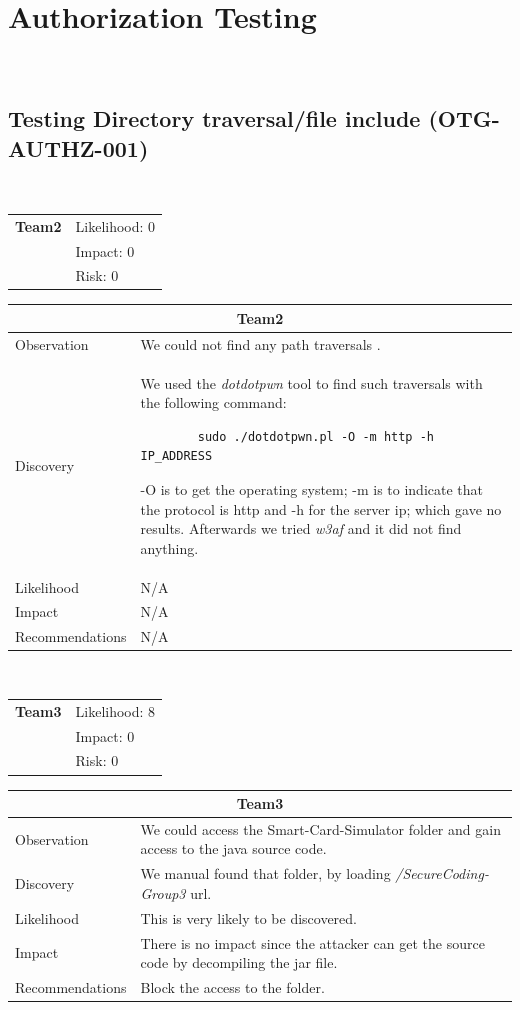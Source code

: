 \documentclass[headsepline,footsepline,footinclude=false,oneside,fontsize=11pt,paper=a4,listof=totoc,bibliography=totoc]{scrbook} %
\begin{document}
\pagebreak
\section{Authorization Testing}\
\subsection{Testing Directory traversal/file include (OTG-AUTHZ-001)}\

\begin{tabular}{cR{12cm}}
	\textbf{Team2} & Likelihood: 0\\& Impact: 0\\& Risk: 0 
\end{tabular}

\begin{tabular}{ l|p{11cm}  }
	\hline
	\multicolumn{2}{c}{\textbf{Team2}} \\
	\hline
	Observation   & We could not find any path traversals .\\
	Discovery  & We used the \textit{dotdotpwn} tool to find such traversals with the following command:
	\begin{lstlisting}
		sudo ./dotdotpwn.pl -O -m http -h IP_ADDRESS 
	\end{lstlisting}
	-O is to get the operating system;  
	-m is to indicate that the protocol is http and -h for the server ip;  
	which gave no results.
	Afterwards we tried \textit{w3af} and it did not find anything.\\
	Likelihood & N/A \\
	Impact    & N/A \\
	Recommendations & N/A \\ 
	\hline
\end{tabular}  \\

 \begin{tabular}{cR{12cm}}
 	\textbf{Team3} & Likelihood: 8\\& Impact: 0\\& Risk: 0 
 \end{tabular}
 
 \begin{tabular}{ l|p{11cm}  }
 	\hline
 	\multicolumn{2}{c}{\textbf{Team3}} \\
 	\hline
 	Observation   & We could access the Smart-Card-Simulator folder and gain access to the java source code.\\
 	Discovery  &  We manual found that folder, by loading \textit{/SecureCoding-Group3} url.\\
 	Likelihood & This is very likely to be discovered. \\
 	Impact    & There is no impact since the attacker can get the source code by decompiling the jar file. \\
 	Recommendations & Block the access to the folder. \\ 
 	\hline
 \end{tabular}  
\pagebreak
\end{document}
